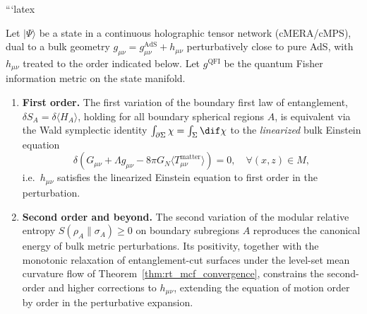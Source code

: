 ```latex
\begin{theorem}
\label{thm:grand_einstein_emergence}
Let $|\Psi\rangle$ be a state in a continuous holographic tensor network (cMERA/cMPS), dual to a bulk geometry $g_{\mu\nu} = g_{\mu\nu}^{\mathrm{AdS}} + h_{\mu\nu}$ perturbatively close to pure AdS, with $h_{\mu\nu}$ treated to the order indicated below. Let $g^{\mathrm{QFI}}$ be the quantum Fisher information metric on the state manifold.
\begin{enumerate}[label=(\roman*)]
    \item \textbf{First order.} The first variation of the boundary first law of entanglement, $\delta S_A = \delta \langle H_A \rangle$, holding for all boundary spherical regions $A$, is equivalent via the Wald symplectic identity $\int_{\partial \Sigma} \chi = \int_\Sigma \dif \chi$ to the \emph{linearized} bulk Einstein equation
    \begin{equation}
        \delta\!\left( G_{\mu\nu} + \Lambda g_{\mu\nu} - 8\pi G_N \langle T_{\mu\nu}^{\mathrm{matter}} \rangle \right) = 0, \quad \forall (x, z) \in M,
    \end{equation}
    i.e.\ $h_{\mu\nu}$ satisfies the linearized Einstein equation to first order in the perturbation.
    \item \textbf{Second order and beyond.} The second variation of the modular relative entropy $S(\rho_A \| \sigma_A) \ge 0$ on boundary subregions $A$ reproduces the canonical energy of bulk metric perturbations. Its positivity, together with the monotonic relaxation of entanglement-cut surfaces under the level-set mean curvature flow of Theorem~\ref{thm:rt_mcf_convergence}, constrains the second-order and higher corrections to $h_{\mu\nu}$, extending the equation of motion order by order in the perturbative expansion.
\end{enumerate}
\end{theorem}
